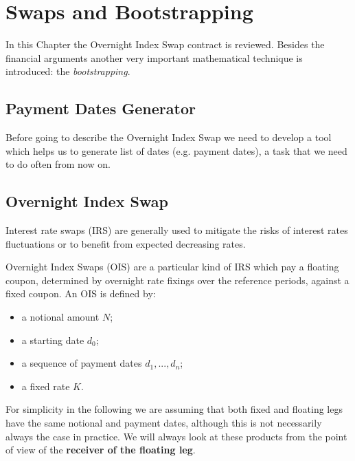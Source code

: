\chapter{Swaps and Bootstrapping}
\label{sec:swaps-and-bootstrapping}

In this Chapter the Overnight Index Swap contract is reviewed. Besides the financial arguments another very important mathematical technique is introduced: the \emph{bootstrapping}.

\section{Payment Dates Generator}
Before going to describe the Overnight Index Swap we need to develop a tool which helps us to generate list of dates (e.g. payment dates), a task that we need to do often from now on. 


\begin{ioutput}
\end{ioutput}

\section{Overnight Index Swap}
\label{overnight-index-swap}

Interest rate swaps (IRS) are generally used to mitigate the risks of interest rates fluctuations or to benefit from expected decreasing rates.

Overnight Index Swaps (OIS) are a particular kind of IRS which pay a floating coupon, determined by overnight rate fixings over the reference periods, against a fixed coupon. An OIS is defined by:

\begin{itemize}
\tightlist
\item
  a notional amount $N$;
\item
  a starting date $d_0$;
\item
  a sequence of payment dates $d_1,...,d_n$;
\item
  a fixed rate $K$.
\end{itemize}

For simplicity in the following we are assuming that both fixed and floating legs have the same notional and payment dates, although this is not necessarily always the case in practice. We will always look at these products from the point of view of the \textbf{receiver of the floating leg}.

